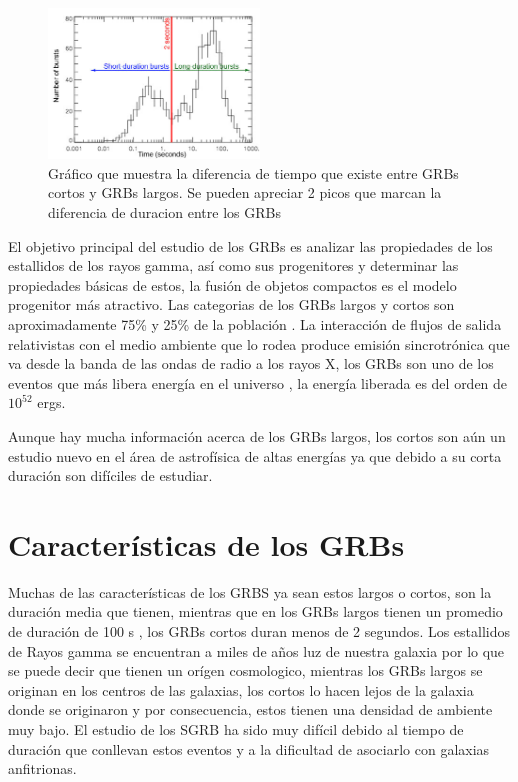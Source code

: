 \documentclass[12pt,a4paper]{book}
\begin{document}
\begin{figure} 
  \centering
    \includegraphics[width=0.5\textwidth]{Figuras/burst_durations_labelled.jpg}
  \caption{Gráfico que muestra la diferencia de tiempo que existe entre GRBs cortos y GRBs largos. Se pueden apreciar 2 picos que marcan la diferencia de duracion entre los GRBs}
  \label{fig:Batse_duration_GRBs}
\end{figure}

El objetivo principal del estudio de los GRBs es analizar las propiedades de los estallidos de los rayos gamma, así como sus progenitores y determinar las propiedades básicas de estos, la fusión de objetos compactos es el modelo progenitor más atractivo.
Las categorias de los GRBs largos y cortos son aproximadamente 75\% y 25\% de la población \cite{GRB:PPP}. %
 La interacción de flujos de salida relativistas con el medio ambiente que lo rodea produce emisión sincrotrónica que va desde la banda de las ondas de radio a los rayos X, los GRBs son uno de los eventos que más libera energía en el universo \cite{Berger:2013jza}, la energía liberada es del orden de $10^{52}$ ergs.

Aunque hay mucha información acerca de los GRBs largos, los cortos son aún un estudio nuevo en el área de astrofísica de altas energías ya que debido a su corta duración son difíciles de estudiar. 
\section{Características de los GRBs}
Muchas de las características de los GRBS ya sean estos largos o cortos, son la duración media que tienen, mientras que en los GRBs largos tienen un promedio de duración de 100 s \cite{PGRB-piran}, los GRBs cortos duran menos de 2 segundos. Los estallidos de Rayos gamma se encuentran a miles de años luz de nuestra galaxia por lo que se puede decir que tienen un orígen cosmologico, mientras los GRBs largos se originan en los centros de las galaxias, los cortos lo hacen lejos de la galaxia donde se originaron y por consecuencia, estos tienen una densidad de ambiente muy bajo. El estudio de los SGRB ha sido muy difícil debido al tiempo de duración que conllevan estos eventos y a la dificultad de asociarlo con galaxias anfitrionas. 
\end{document}
